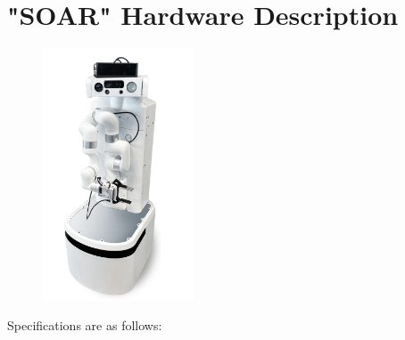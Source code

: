 
\section*{"SOAR" Hardware Description}%
\label{sec:annex-OPL}

\setlength\intextsep{0pt}
\begin{figure}
	\centering
	\includegraphics[width=0.4\textwidth]{images/soar.png}
	\label{fig:soar}
\end{figure}

Specifications are as follows:

